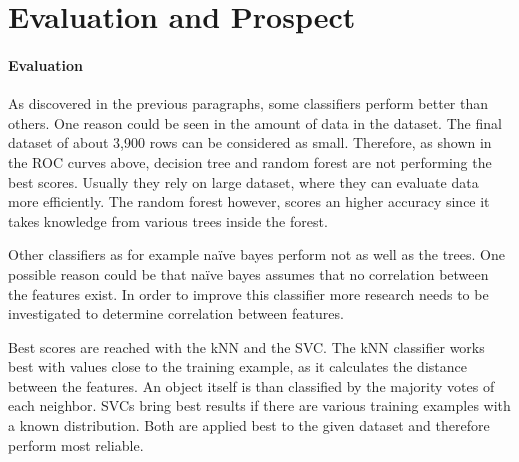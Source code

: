 \section{Evaluation and Prospect}
\paragraph{Evaluation}

\label{cha:prospect}

As discovered in the previous paragraphs, some classifiers perform better than others. One reason could be seen in the amount of data in the dataset. The final dataset of about 3,900 rows can be considered as small. Therefore, as shown in the ROC curves above, decision tree and random forest are not performing the best scores. Usually they rely on large dataset, where they can evaluate data more efficiently. The random forest however, scores an higher accuracy since it takes knowledge from various trees inside the forest.



Other classifiers as for example na\"{i}ve bayes perform not as well as the trees. One possible reason could be that na\"{i}ve bayes assumes that no correlation between the features exist. In order to improve this classifier more research needs to be investigated to determine correlation between features.

Best scores are reached with the kNN and the SVC. The kNN classifier works best with values close to the training example, as it calculates the distance between the features. An object itself is than classified by the majority votes of each neighbor.
SVCs bring best results if there are various training examples with a known distribution. Both are applied best to the given dataset and therefore perform most reliable.








